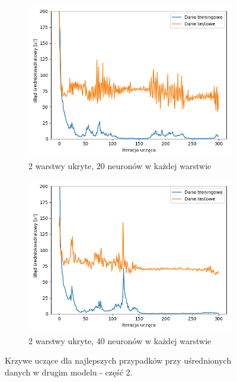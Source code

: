 \documentclass[12pt]{aghdpl}
\begin{document}
		 \begin{figure}[h]
			\centering
		 	\begin{subfigure}{.8\linewidth}
		 		\includegraphics[width =\linewidth]{wykresy/5_usrednianie_danych/2_warstwy_20_neuronow_wykres_uczenia.png}
		 		\caption{2 warstwy ukryte, 20 neuronów w każdej warstwie}
		 	\end{subfigure}
		 	\begin{subfigure}{.8\linewidth}
		 		\includegraphics[width =\linewidth]{wykresy/5_usrednianie_danych/2_warstwy_40_neuronow_wykres_uczenia.png}
		 		\caption{2 warstwy ukryte, 40 neuronów w każdej warstwie}
		 	\end{subfigure}
	 	
 			\caption{Krzywe uczące dla najlepszych przypadków przy uśrednionych danych w drugim modelu - część 2.}
			\label{fig: drugi_model_przy_usrednionych_danych_wykresy_uczenia_2}
		\end{figure}
		
\end{document}
